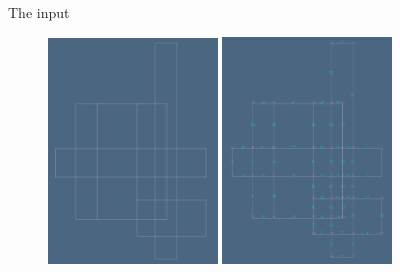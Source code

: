\documentclass[11pt, oneside]{article}   	%
\begin{document}
The input

\begin{figure}[htbp] %
   \centering
   \includegraphics[width=0.4\textwidth]{rectangles0} 
   \includegraphics[width=0.4\textwidth]{rectangles1} 
   

\end{figure}
\end{document}
